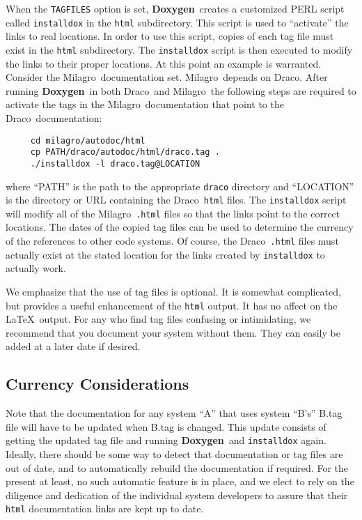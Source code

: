 \documentclass[11pt]{ResearchNote}
\newcommand{\draco}{{\normalfont\sffamily Draco}}
\newcommand{\milagro}{{\normalfont\sffamily Milagro}}
\newcommand{\doxy}{{\normalfont\bfseries Doxygen}}
\begin{document}
When the \texttt{TAGFILES} option is set, \doxy\ creates a customized
PERL script called \texttt{installdox} in the \texttt{html}
subdirectory.  This script is used to ``activate'' the links to real
locations.  In order to use this script, copies of each tag file must
exist in the \texttt{html} subdirectory.  The \texttt{installdox}
script is then executed to modify the links to their proper locations.
At this point an example is warranted.  Consider the \milagro\ 
documentation set.  \milagro\ depends on \draco.  After running
\doxy\ in both \draco\ and \milagro\ the following
steps are required to activate the tags in the \milagro\ documentation
that point to the \draco\ documentation:
\begin{verbatim}
     cd milagro/autodoc/html
     cp PATH/draco/autodoc/html/draco.tag .
     ./installdox -l draco.tag@LOCATION
\end{verbatim}
where ``PATH'' is the path to the appropriate \texttt{draco} directory
and ``LOCATION'' is the
directory or URL containing the \draco\ \texttt{html} files.
The \texttt{installdox} script will modify all of the \milagro\ \texttt{.html}
files so that the links point to the correct locations.    The dates of the
copied tag files
can be used to determine the currency of the references to other code systems.
Of course, the \draco\ \texttt{.html} files must actually exist at the stated location
for the links created by \texttt{installdox} to actually work.

We emphasize that the use of tag files is optional. It is somewhat complicated,
but provides a useful enhancement of the \texttt{html} output. It has no
affect on the \LaTeX\ output. For any who find tag files confusing or
intimidating, we recommend that you document your system without them. They
can easily be added at a later date if desired.


\subsection{Currency Considerations}
Note that the documentation for 
any system ``A'' that uses system ``B's'' B.tag file will have to be
updated when B.tag is changed. This update consists of getting the updated
tag file and running \doxy\ and \texttt{installdox} again. 
Ideally, there should be some way to detect that documentation
or tag files are out of date, and to automatically rebuild the
documentation if required.  For the present at least, no such automatic
feature is in place, and we elect to rely
on the diligence and dedication of the individual system developers to 
assure that their \texttt{html} documentation links are kept up to date. 
\end{document}
